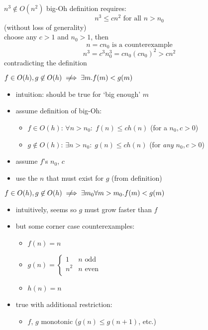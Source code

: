 \begin{frame}{$n^3\not\in O(n^2)$}
big-Oh definition requires:
\[n^3 \le c n^2 \text{ for all $n > n_0$}\]
(without loss of generality) \\
choose any $c > 1$ and $n_0 > 1$, then \\
\[
    n=cn_0 \text{ is a counterexample}
\]
\[ n^3 = c^3n_0^3 = cn_0 (cn_0)^2 > c n^2 \]
contradicting the definition
\end{frame}

\begin{frame}{ \fontsize{16}{17}\selectfont$f\in O(h), g\not\in O(h) \notimplies \exists m. f(m)<g(m)$}
    \begin{itemize}
        \item intuition: should be true for `big enough' $m$
        \item assume definition of big-Oh:
            \begin{itemize}
                \item $f \in O(h)$: $\forall n>n_0:\;f(n) \le c h(n)$ (for a $n_0, c > 0$)
                \item $g \not\in O(h)$: $\exists n > n_0:\;g(n) \le c h(n)$ (for \textit{any} $n_0, c > 0$)
            \end{itemize}
        \item assume $f$'s $n_0$, $c$
        \item use the $n$ that must exist for $g$ (from definition)
    \end{itemize}
\end{frame}

\begin{frame}{ \fontsize{15}{16}\selectfont$f\in O(h), g\not\in O(h) \notimplies \exists m_0\forall m>m_0. f(m) <g(m)$}
    \begin{itemize}
    \item intuitively, seems so $g$ must grow faster than $f$
    \item but some corner case counterexamples:
        \begin{itemize}
            \item $f(n) = n$
            \item $g(n) = \begin{cases} 1 & n \text{ odd} \\n^2 & n \text{ even} \\ \end{cases}$
            \item $h(n) = n$
        \end{itemize}
    \item true with additional restriction:
        \begin{itemize}
        \item $f$, $g$ monotonic ($g(n) \le g(n+1)$, etc.)
        \end{itemize}
    \end{itemize}
\end{frame}
